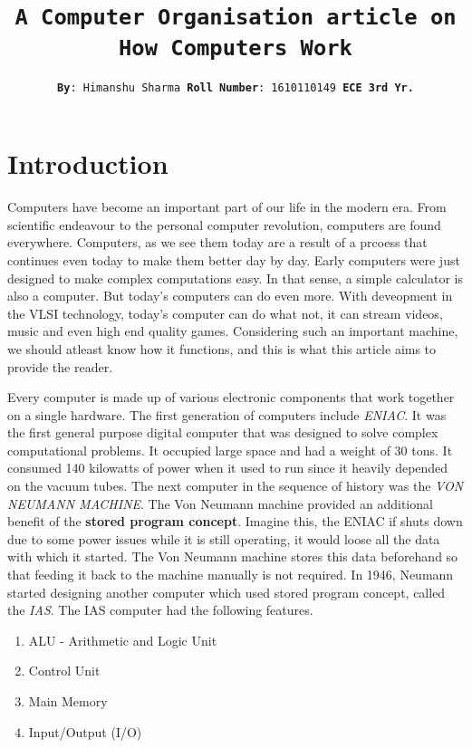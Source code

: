 \documentclass{article}
\title{\texttt{A Computer Organisation article on \\ \Huge How Computers Work}}
\author{\texttt{{\bf By}: Himanshu Sharma  \hspace{10mm} {\bf Roll Number}: 1610110149 \hspace{10mm} {\bf ECE 3rd Yr.}}}
\date{}
\begin{document}
\selectfont
\maketitle
\tableofcontents
\newpage

\section{Introduction}
Computers have become an important part of our life in the modern era. From scientific endeavour to the personal computer revolution, computers are found everywhere. Computers, as we see them today are a result of a prcoess that continues even today to make them better day by day. Early computers were just designed to make complex computations easy. In that sense, a simple calculator is also a computer. But today's computers can do even more. With deveopment in the VLSI technology, today's computer can do what not, it can stream videos, music and even high end quality games. Considering such an important machine, we should atleast know how it functions, and this is what this article aims to provide the reader. \par Every computer is made up of various electronic components that work together on a single hardware. The first generation of computers include \textit{ENIAC}. It was the first general purpose digital computer that was designed to solve complex computational problems. It occupied large space and had a weight of 30 tons. It consumed 140 kilowatts of power when it used to run since it heavily depended on the vacuum tubes. The next computer in the sequence of history was the \textit{VON NEUMANN MACHINE}. The Von Neumann machine provided an additional benefit of the {\bf stored program concept}. Imagine this, the ENIAC if shuts down due to some power issues while it is still operating, it would loose all the data with which it started. The Von Neumann machine stores this data beforehand so that feeding it back to the machine manually is not required. In 1946, Neumann started designing another computer which used stored program concept, called the \textit{IAS}. The IAS computer had the following features.
\begin{enumerate}
\item ALU - Arithmetic and Logic Unit
\item Control Unit
\item Main Memory
\item Input/Output (I/O)
\end{enumerate}
\end{document}
